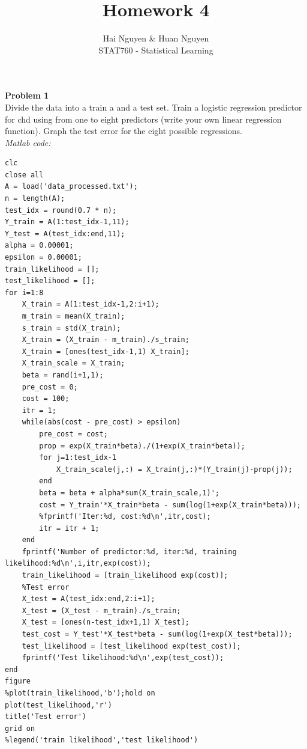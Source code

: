 \documentclass[12pt]{article}
\begin{document}
 
 
 
\title{Homework 4}%
\author{Hai Nguyen \& Huan Nguyen\\ %
STAT760 - Statistical Learning} %
\maketitle
\textbf{Problem 1}
\\Divide the data into a train a and a test set. Train a logistic regression predictor for chd using from one to eight predictors (write your own linear regression function). Graph the test error for the eight possible regressions.\\
\textit{Matlab code:}
\begin{lstlisting}
clc
close all
A = load('data_processed.txt');
n = length(A);
test_idx = round(0.7 * n);
Y_train = A(1:test_idx-1,11);
Y_test = A(test_idx:end,11);
alpha = 0.00001;
epsilon = 0.00001;
train_likelihood = [];
test_likelihood = [];
for i=1:8
    X_train = A(1:test_idx-1,2:i+1);
    m_train = mean(X_train);
    s_train = std(X_train);
    X_train = (X_train - m_train)./s_train;
    X_train = [ones(test_idx-1,1) X_train];
    X_train_scale = X_train;
    beta = rand(i+1,1);
    pre_cost = 0;
    cost = 100;
    itr = 1;
    while(abs(cost - pre_cost) > epsilon)
        pre_cost = cost;
        prop = exp(X_train*beta)./(1+exp(X_train*beta));
        for j=1:test_idx-1
            X_train_scale(j,:) = X_train(j,:)*(Y_train(j)-prop(j));
        end
        beta = beta + alpha*sum(X_train_scale,1)';
        cost = Y_train'*X_train*beta - sum(log(1+exp(X_train*beta)));
        %fprintf('Iter:%d, cost:%d\n',itr,cost);
        itr = itr + 1;
    end
    fprintf('Number of predictor:%d, iter:%d, training likelihood:%d\n',i,itr,exp(cost));
    train_likelihood = [train_likelihood exp(cost)];
    %Test error
    X_test = A(test_idx:end,2:i+1);
    X_test = (X_test - m_train)./s_train;
    X_test = [ones(n-test_idx+1,1) X_test];    
    test_cost = Y_test'*X_test*beta - sum(log(1+exp(X_test*beta)));
    test_likelihood = [test_likelihood exp(test_cost)];
    fprintf('Test likelihood:%d\n',exp(test_cost));
end
figure
%plot(train_likelihood,'b');hold on
plot(test_likelihood,'r')
title('Test error')
grid on
%legend('train likelihood','test likelihood')
\end{lstlisting} 
\end{document}
